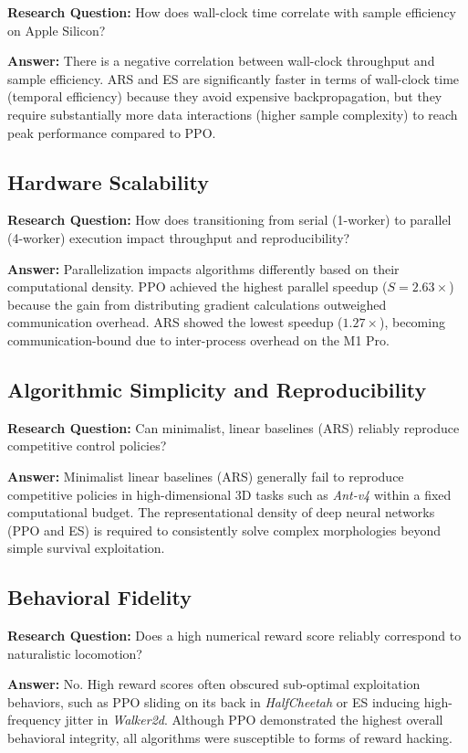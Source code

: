 \textbf{Research Question:} How does wall-clock time correlate with sample efficiency on Apple Silicon?

\textbf{Answer:} There is a negative correlation between wall-clock throughput and sample efficiency. ARS and ES are significantly faster in terms of wall-clock time (temporal efficiency) because they avoid expensive backpropagation, but they require substantially more data interactions (higher sample complexity) to reach peak performance compared to PPO.

\subsection{Hardware Scalability}

\textbf{Research Question:} How does transitioning from serial (1-worker) to parallel (4-worker) execution impact throughput and reproducibility?

\textbf{Answer:} Parallelization impacts algorithms differently based on their computational density. PPO achieved the highest parallel speedup ($S = 2.63\times$) because the gain from distributing gradient calculations outweighed communication overhead. ARS showed the lowest speedup ($1.27\times$), becoming communication-bound due to inter-process overhead on the M1 Pro.

\subsection{Algorithmic Simplicity and Reproducibility}

\textbf{Research Question:} Can minimalist, linear baselines (ARS) reliably reproduce competitive control policies?

\textbf{Answer:} Minimalist linear baselines (ARS) generally fail to reproduce competitive policies in high-dimensional 3D tasks such as \textit{Ant-v4} within a fixed computational budget. The representational density of deep neural networks (PPO and ES) is required to consistently solve complex morphologies beyond simple survival exploitation.

\subsection{Behavioral Fidelity}

\textbf{Research Question:} Does a high numerical reward score reliably correspond to naturalistic locomotion?

\textbf{Answer:} No. High reward scores often obscured sub-optimal exploitation behaviors, such as PPO sliding on its back in \textit{HalfCheetah} or ES inducing high-frequency jitter in \textit{Walker2d}. Although PPO demonstrated the highest overall behavioral integrity, all algorithms were susceptible to forms of reward hacking.

